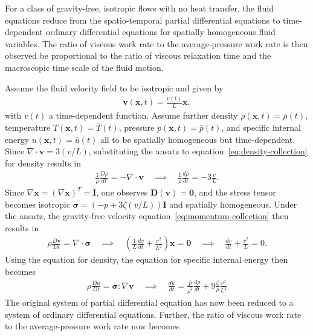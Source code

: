 \begin{example} 
    For a class of gravity-free, isotropic flows with no heat transfer, the fluid equations reduce from the spatio-temporal partial differential equations to time-de\-pen\-dent ordinary differential equations for spatially homogeneous fluid variables. The ratio of viscous work rate to the average-pressure work rate is then observed be proportional to the ratio of viscous relaxation time and the macroscopic time scale of the fluid motion.
    
    Assume the fluid velocity field to be isotropic and given by
    \begin{align*}
        \bm{v}(\bm{x},t)=\frac{v(t)}{L}\bm{x},
    \end{align*}
    with $v(t)$ a time-dependent function. Assume further density $\rho(\bm{x},t)=\bar{\rho}(t)$, temperature $T(\bm{x},t)=\bar{T}(t)$, pressure $p(\bm{x},t)=\bar{p}(t)$, and specific internal energy $u(\bm{x},t)=\bar{u}(t)$ all to be spatially homogeneous but time-dependent. Since $\nabla\cdot\bm{v}=3(v/L)$, substituting the ansatz to equation~\eqref{eq:density-collection} for density results in
    \begin{align*}
        \frac{1}{\rho}\frac{D\rho}{dt}=-\nabla\cdot\bm{v}\quad \implies \quad \frac{1}{\bar{\rho}}\frac{d\bar{\rho}}{dt}=-3\frac{v}{L}.
    \end{align*}
    Since $\nabla\bm{x}=(\nabla\bm{x})^T=\bm{I}$, one observes $\bm{D}(\bm{v})=\bm{0}$, and the stress tensor becomes isotropic $\bm{\sigma}=(-p+3\zeta (v/L))\bm{I}$ and spatially homogeneous. Under the ansatz, the gravity-free velocity equation~\eqref{eq:momentum-collection} then results in
    \begin{align*}
        \rho\frac{D\bm{v}}{Dt}=\nabla\cdot\bm{\sigma} \quad \implies \quad \left(\frac{1}{L}\frac{dv}{dt}+\frac{v^2}{L^2}\right)\bm{x}=\bm{0} \quad\implies\quad \frac{dv}{dt}+\frac{v^2}{L}=0.
    \end{align*}
    Using the equation for density, the equation for specific internal energy then becomes
    \begin{align*}
        \rho\frac{Du}{Dt}=\bm{\sigma}:\nabla\bm{v} \quad \implies\quad \frac{d\bar{u}}{dt}=\frac{\bar{p}}{\bar{\rho}^2}\frac{d\bar{\rho}}{dt}+9\frac{\zeta}{\bar{\rho}}\frac{v^2}{L^2}
    \end{align*}
    The original system of partial differential equation has now been reduced to a system of ordinary differential equations. Further, the ratio of viscous work rate to the average-pressure work rate now becomes

\end{example}
